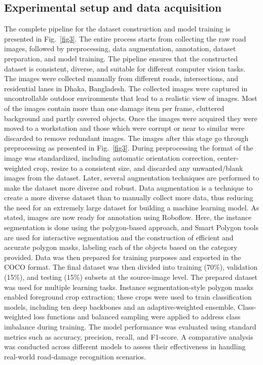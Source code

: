 \documentclass{article}
\begin{document}
\subsection*{Experimental setup and data acquisition}
The complete pipeline for the dataset construction and model training is presented in Fig.~\ref{fig3}. The entire process starts from collecting the raw road images, followed by preprocessing, data augmentation, annotation, dataset preparation, and model training. The pipeline ensures that the constructed dataset is consistent, diverse, and suitable for different computer vision tasks. The images were collected manually from different roads, intersections, and residential lanes in Dhaka, Bangladesh. The collected images were captured in uncontrollable outdoor environments that lead to a realistic view of images. Most of the images contain more than one damage item per frame, cluttered background and partly covered objects. Once the images were acquired they were moved to a workstation and those which were corrupt or near to similar were discarded to remove redundant images. The images after this stage go through preprocessing as presented in Fig.~\ref{fig3}. During preprocessing the format of the image was standardized, including automatic orientation correction, center-weighted crop, resize to a consistent size, and discarded any unwanted/blank images from the dataset. Later, several augmentation techniques are performed to make the dataset more diverse and robust. Data augmentation is a technique to create a more diverse dataset than to manually collect more data, thus reducing the need for an extremely large dataset for building a machine learning model. As stated, images are now ready for annotation using Roboflow. Here, the instance segmentation is done using the polygon-based approach, and Smart Polygon tools are used for interactive segmentation and the construction of efficient and accurate polygon masks, labeling each of the objects based on the category provided. Data was then prepared for training purposes and exported in the COCO format. The final dataset was then divided into training (70\%), validation (15\%), and testing (15\%) subsets at the source-image level. The prepared dataset was used for multiple learning tasks. Instance segmentation-style polygon masks enabled foreground crop extraction; these crops were used to train classification models, including ten deep backbones and an adaptive-weighted ensemble. Class-weighted loss functions and balanced sampling were applied to address class imbalance during training. The model performance was evaluated using standard metrics such as accuracy, precision, recall, and F1-score. A comparative analysis was conducted across different models to assess their effectiveness in handling real-world road-damage recognition scenarios. 
\end{document}
